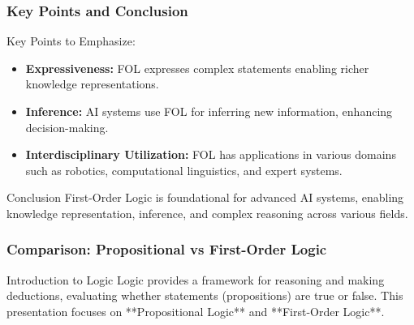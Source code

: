 \documentclass[aspectratio=169]{beamer}
\begin{document}
\begin{frame}[fragile]
    \frametitle{Key Points and Conclusion}
    \begin{block}{Key Points to Emphasize:}
        \begin{itemize}
            \item \textbf{Expressiveness:} FOL expresses complex statements enabling richer knowledge representations.
            \item \textbf{Inference:} AI systems use FOL for inferring new information, enhancing decision-making.
            \item \textbf{Interdisciplinary Utilization:} FOL has applications in various domains such as robotics, computational linguistics, and expert systems.
        \end{itemize}
    \end{block}
    \begin{block}{Conclusion}
        First-Order Logic is foundational for advanced AI systems, enabling knowledge representation, inference, and complex reasoning across various fields.
    \end{block}
\end{frame}

\begin{frame}[fragile]
    \frametitle{Comparison: Propositional vs First-Order Logic}
    \begin{block}{Introduction to Logic}
        Logic provides a framework for reasoning and making deductions, evaluating whether statements (propositions) are true or false. This presentation focuses on **Propositional Logic** and **First-Order Logic**.
    \end{block}
\end{frame}
\end{document}
